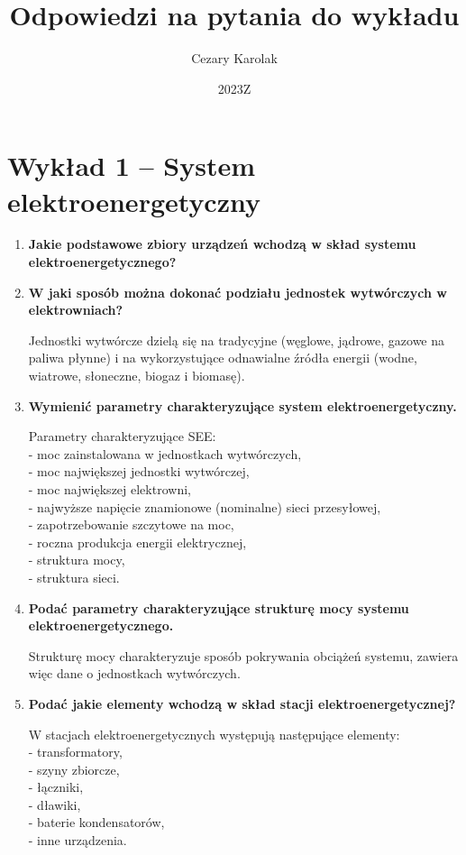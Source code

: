 \documentclass[12pt]{article}
\title{Odpowiedzi na pytania do wykładu}
\author{Cezary Karolak}
\date{2023Z}
\newcommand{\pytanie}[1]{\item \textbf{#1}}
\begin{document}
\sloppy  
\maketitle
\tableofcontents
\newpage


\section{Wykład 1 -- System elektroenergetyczny}
\begin{enumerate}
	\pytanie{Jakie podstawowe zbiory urządzeń wchodzą w skład systemu elektroenergetycznego?}
	
	\pytanie{W jaki sposób można dokonać podziału jednostek wytwórczych w elektrowniach?}
	
	    Jednostki wytwórcze dzielą się na tradycyjne (węglowe, jądrowe, gazowe na paliwa płynne) i na wykorzystujące odnawialne źródła energii (wodne, wiatrowe, słoneczne, biogaz i biomasę).
	
	\pytanie{Wymienić parametry charakteryzujące system elektroenergetyczny.}
	
	    Parametry charakteryzujące SEE:\\
	    - moc zainstalowana w jednostkach wytwórczych,\\
	    - moc największej jednostki wytwórczej,\\
	    - moc największej elektrowni,\\
	    - najwyższe napięcie znamionowe (nominalne) sieci przesyłowej,\\
	    - zapotrzebowanie szczytowe na moc,\\
	    - roczna produkcja energii elektrycznej,\\
	    - struktura mocy,\\
	    - struktura sieci.
	
	\pytanie{Podać parametry charakteryzujące strukturę mocy systemu elektroenergetycznego.}
	
	    Strukturę mocy charakteryzuje sposób pokrywania obciążeń systemu, zawiera więc dane o jednostkach wytwórczych.
	
	\pytanie{Podać jakie elementy wchodzą w skład stacji elektroenergetycznej?}
	
	    W stacjach elektroenergetycznych występują następujące elementy:\\
	    - transformatory,\\
	    - szyny zbiorcze,\\
	    - łączniki,\\
	    - dławiki,\\
	    - baterie kondensatorów,\\
	    - inne urządzenia.
	

\end{enumerate}
\end{document}
